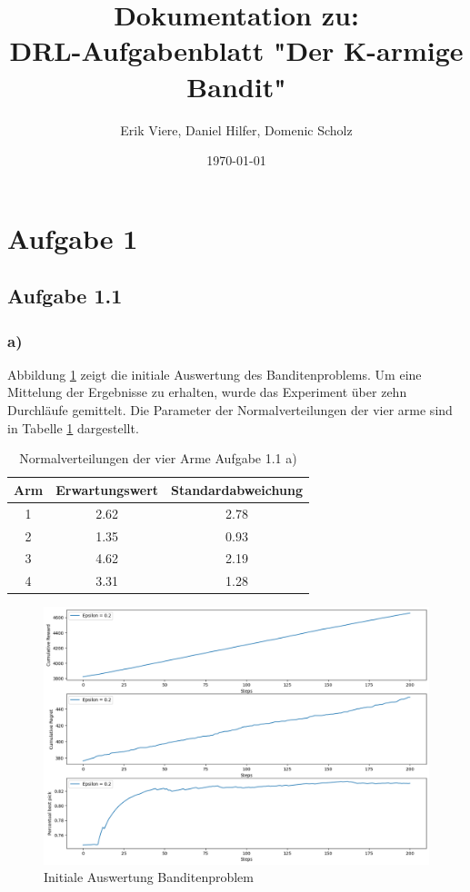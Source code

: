 \documentclass[11pt]{article}
\title{\textbf{Dokumentation zu:\\DRL-Aufgabenblatt "Der K-armige Bandit"}}
\author{ Erik Viere, Daniel Hilfer, Domenic Scholz}
\date{\today}
\begin{document}
\maketitle	
\pagebreak


\section*{Aufgabe 1}
\subsection*{Aufgabe 1.1}
\subsubsection*{a)}
Abbildung \ref{img:1_1a} zeigt die initiale Auswertung des Banditenproblems. Um eine Mittelung der Ergebnisse zu erhalten, wurde das Experiment über zehn Durchläufe gemittelt. Die Parameter der Normalverteilungen der vier arme sind in Tabelle \ref{table:dist_1_1a} dargestellt.
\begin{table}[h]
    \centering
    \begin{tabular}{|c|c|c|}
        \hline
        Arm & Erwartungswert & Standardabweichung \\
        \hline
        1 & 2.62 & 2.78\\
        \hline
        2 & 1.35 & 0.93 \\
        \hline
        3 & 4.62 & 2.19\\
        \hline
        4 & 3.31 & 1.28\\
        \hline
    \end{tabular}
    \caption{Normalverteilungen der vier Arme Aufgabe 1.1 a)}
    \label{table:dist_1_1a}
\end{table}
\begin{figure}[h]
    \centering
    \includegraphics[width=\textwidth]{img/1_1a.png}
    \caption{Initiale Auswertung Banditenproblem}
    \label{img:1_1a}
\end{figure}
\end{document}
